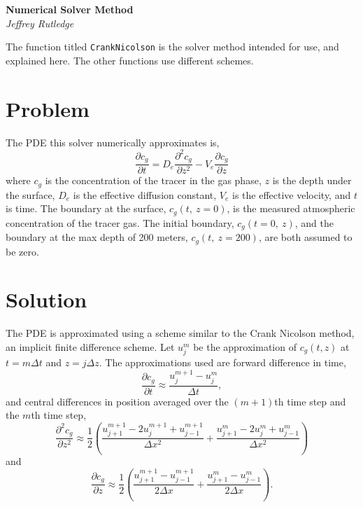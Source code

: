 \documentclass[11pt, letterpaper]{article}
\begin{document}
{\Large \bf Numerical Solver Method} \\
{\small \it Jeffrey Rutledge}

The function titled \texttt{CrankNicolson} is the solver method intended for use, and explained here.
The other functions use different schemes.

\section*{Problem}

The PDE this solver numerically approximates is,
\[
    \frac{\partial c_g}{\partial t} = D_e \frac{\partial^2 c_g}{\partial z^2} - V_e \frac{\partial c_g}{\partial z}
\]
where $c_g$ is the concentration of the tracer in the gas phase, $z$ is the depth under the surface, $D_e$ is the effective diffusion constant, $V_e$ is the effective velocity, and $t$ is time.
The boundary at the surface, $c_g(t,\ z = 0)$, is the measured atmospheric concentration of the tracer gas.
The initial boundary, $c_g(t = 0,\ z)$, and the boundary at the max depth of 200 meters, $c_g(t,\ z = 200)$, are both assumed to be zero.

\section*{Solution}
The PDE is approximated using a scheme similar to the Crank Nicolson method, an implicit finite difference scheme.
Let $u^m_j$ be the approximation of $c_g(t, z)$ at $t = m \Delta t$ and $z = j \Delta z$.
The approximations used are forward difference in time,
\[
    \frac{\partial c_g}{\partial t} \approx \frac{u^{m + 1}_j - u^m_j}{\Delta t},
\]
and central differences in position averaged over the $(m + 1)$th time step and the $m$th time step,
\[
    \frac{\partial^2 c_g}{\partial z^2} \approx \frac{1}{2} \left(
        \frac{u^{m + 1}_{j + 1} - 2u^{m + 1}_j + u^{m + 1}_{j - 1}}{\Delta x^2} +
    \frac{u^{m}_{j + 1} - 2u^{m}_j + u^{m}_{j - 1}}{\Delta x^2} \right)
\]
and
\[
    \frac{\partial c_g}{\partial z} \approx \frac{1}{2} \left(
        \frac{u^{m + 1}_{j + 1} - u^{m + 1}_{j - 1}}{2\Delta x} +
    \frac{u^{m}_{j + 1} - u^{m}_{j - 1}}{2\Delta x} \right).
\]
\end{document}
